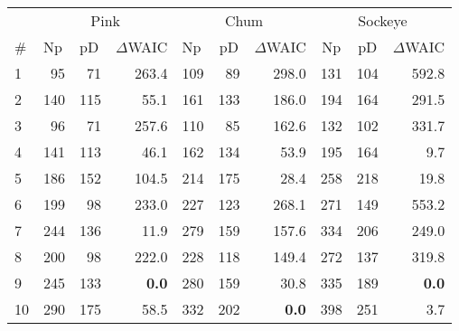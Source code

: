 \begin{tabular}{lrrrrrrrrr}
  \hline
  \multicolumn{1}{r}{} &
            \multicolumn{3}{c}{Pink} &
            \multicolumn{3}{c}{Chum} &
            \multicolumn{3}{c}{Sockeye} \\ 
  \cmidrule(lr){2-4} \cmidrule(lr){5-7} \cmidrule(lr){8-10} 
  \multicolumn{1}{l}{\#} & 
    \multicolumn{1}{l}{Np} & 
    \multicolumn{1}{l}{pD} & 
    \multicolumn{1}{l}{$\Delta$WAIC} & 
    \multicolumn{1}{l}{Np} & 
    \multicolumn{1}{c}{pD} & 
    \multicolumn{1}{c}{$\Delta$WAIC} & 
    \multicolumn{1}{c}{Np} & 
    \multicolumn{1}{c}{pD} & 
    \multicolumn{1}{l}{$\Delta$WAIC} \\ 
  \cmidrule{1-10} 
1 & 95 & 71 & 263.4 & 109 & 89 & 298.0 & 131 & 104 & 592.8 \\ 
  2 & 140 & 115 & 55.1 & 161 & 133 & 186.0 & 194 & 164 & 291.5 \\ 
  3 & 96 & 71 & 257.6 & 110 & 85 & 162.6 & 132 & 102 & 331.7 \\ 
  4 & 141 & 113 & 46.1 & 162 & 134 & 53.9 & 195 & 164 & 9.7 \\ 
  5 & 186 & 152 & 104.5 & 214 & 175 & 28.4 & 258 & 218 & 19.8 \\ 
  6 & 199 & 98 & 233.0 & 227 & 123 & 268.1 & 271 & 149 & 553.2 \\ 
  7 & 244 & 136 & 11.9 & 279 & 159 & 157.6 & 334 & 206 & 249.0 \\ 
  8 & 200 & 98 & 222.0 & 228 & 118 & 149.4 & 272 & 137 & 319.8 \\ 
  9 & 245 & 133 & \textbf{0.0} & 280 & 159 & 30.8 & 335 & 189 & \textbf{0.0} \\ 
  10 & 290 & 175 & 58.5 & 332 & 202 & \textbf{0.0} & 398 & 251 & 3.7 \\ 
   \hline
\end{tabular}
